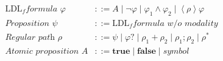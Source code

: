 \documentclass[preview=true]{standalone}
\newcommand{\LDL}{\text{LDL}_{f}}
\newcommand{\eventually}[1]{\left<#1\right>}
\begin{document}
\begin{table}[t]
\begin{align*}
\LDL \textit{formula }
  \varphi &::=
  A
  \mid \neg\varphi
  \mid \varphi_1 \land \varphi_2
  \mid \eventually{\rho}\varphi
\\
\textit{Proposition }
  \psi &::= \LDL \textit{formula w/o modality}
\\
\textit{Regular path }
\rho &::=
  \psi
  \mid \varphi?
  \mid \rho_1 + \rho_2
  \mid \rho_1; \rho_2
  \mid \rho^\ast
  \\
\textit{Atomic proposition }
A &::=
  \textbf{true}
  \mid \textbf{false}
  \mid \textit{symbol}
\end{align*}
\end{table}
\smallskip
\end{document}

